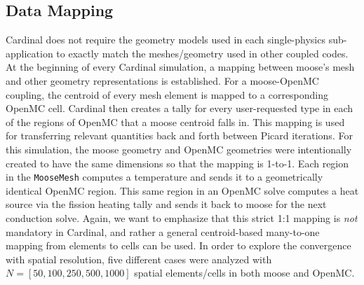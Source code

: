 \documentclass[letterpaper]{mc2023}
\begin{document}
\subsection{Data Mapping}
Cardinal does not require the geometry models used in each single-physics sub-application to exactly match the meshes/geometry used in
other coupled codes. At the beginning of every Cardinal simulation, a mapping between \gls{moose}'s mesh and other geometry representations
is established. For a \gls{moose}-OpenMC coupling, the centroid of every mesh element is mapped to a corresponding OpenMC cell. Cardinal
then creates a tally for every user-requested type in each of the regions of OpenMC that a \gls{moose} centroid falls in. This mapping is
used for transferring relevant quantities back and forth between Picard iterations. For this simulation, the \gls{moose} geometry and OpenMC
geometries were intentionally created to have the same dimensions so that the mapping is 1-to-1. Each region in the \texttt{MooseMesh}
computes a temperature and sends it to a geometrically identical OpenMC region. This same region in an OpenMC solve computes a heat source
via the fission heating tally and sends it back to \gls{moose} for the next conduction solve. Again, we want to emphasize that this strict
1:1 mapping is {\it not} mandatory in Cardinal, and rather a general centroid-based many-to-one mapping from elements to cells can be used. 
In order to explore the convergence with spatial resolution, five different cases were analyzed with $N=[50, 100, 250, 500, 1000]$ spatial
elements/cells in both \gls{moose} and OpenMC.
\end{document}
